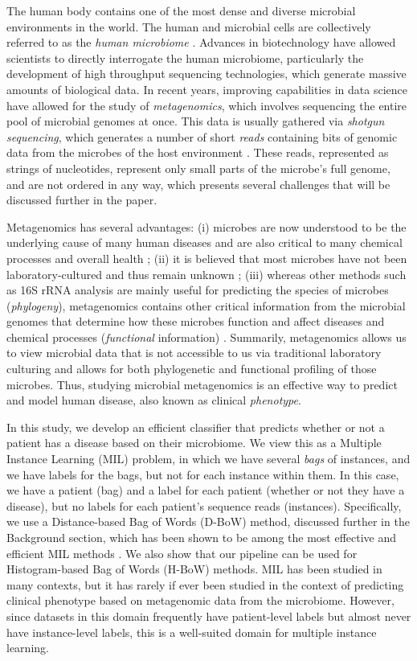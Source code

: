 
The human body contains one of the most dense and diverse microbial environments in the world. The human and microbial cells are collectively referred to as the \emph{human microbiome} \cite{turnbaugh_human_2007,backhed_host-bacterial_2005}. Advances in biotechnology have allowed scientists to directly interrogate the human microbiome, particularly the development of high throughput sequencing technologies, which generate massive amounts of biological data. In recent years, improving capabilities in data science have allowed for the study of \emph{metagenomics}, which involves sequencing the entire pool of microbial genomes at once. This data is usually gathered via \emph{shotgun sequencing}, which generates a number of short \emph{reads} containing bits of genomic data from the microbes of the host environment \cite{messing81}. These reads, represented as strings of nucleotides, represent only small parts of the microbe's full genome, and are not ordered in any way, which presents several challenges that will be discussed further in the paper. 

Metagenomics has several advantages: (i) microbes are now understood to be the underlying cause of many human diseases and are also critical to many chemical processes and overall health \cite{handelsman04}; (ii) it is believed that most microbes have not been laboratory-cultured and thus remain unknown \cite{handelsman04}; (iii) whereas other methods such as 16S rRNA analysis are mainly useful for predicting the species of microbes (\emph{phylogeny}), metagenomics contains other critical information from the microbial genomes that determine how these microbes function and affect diseases and chemical processes (\emph{functional} information) \cite{handelsman04}. Summarily, metagenomics allows us to view microbial data that is not accessible to us via traditional laboratory culturing and allows for both phylogenetic and functional profiling of those microbes. Thus, studying microbial metagenomics is an effective way to predict and model human disease, also known as clinical \emph{phenotype}.

In this study, we develop an efficient classifier that predicts whether or not a patient has a disease based on their microbiome. We view this as a Multiple Instance Learning (MIL) problem, in which we have several \emph{bags} of instances, and we have labels for the bags, but not for each instance within them. In this case, we have a patient (bag) and a label for each patient (whether or not they have a disease), but no labels for each patient's sequence reads (instances). Specifically, we use a Distance-based Bag of Words (D-BoW) method, discussed further in the Background section, which has been shown to be among the most effective and efficient MIL methods \cite{amores13}. We also show that our pipeline can be used for Histogram-based Bag of Words (H-BoW) methods. MIL has been studied in many contexts, but it has rarely if ever been studied in the context of predicting clinical phenotype based on metagenomic data from the microbiome. However, since datasets in this domain frequently have patient-level labels but almost never have instance-level labels, this is a well-suited domain for multiple instance learning. 

